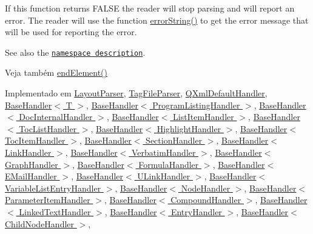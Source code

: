 If this function returns F\-A\-L\-S\-E the reader will stop parsing and will report an error. The reader will use the function \hyperlink{class_q_xml_content_handler_ac86bbbabef3a52aec7615cbbc0adb3f4}{error\-String()} to get the error message that will be used for reporting the error.

See also the \href{xml-sax.html#namespaces}{\tt namespace description}.

\begin{DoxySeeAlso}{Veja também}
\hyperlink{class_q_xml_content_handler_ac85feb837d3634e775cc7c76df84cce0}{end\-Element()} 
\end{DoxySeeAlso}


Implementado em \hyperlink{class_layout_parser_a3ebad496b56e71d502ae20cafd62d524}{Layout\-Parser}, \hyperlink{class_tag_file_parser_a3ebad496b56e71d502ae20cafd62d524}{Tag\-File\-Parser}, \hyperlink{class_q_xml_default_handler_a0712995308713e9df1c0d389568a344b}{Q\-Xml\-Default\-Handler}, \hyperlink{class_base_handler_af861c355ac62b4b24365ddfd226eccd7}{Base\-Handler$<$ T $>$}, \hyperlink{class_base_handler_af861c355ac62b4b24365ddfd226eccd7}{Base\-Handler$<$ Program\-Listing\-Handler $>$}, \hyperlink{class_base_handler_af861c355ac62b4b24365ddfd226eccd7}{Base\-Handler$<$ Doc\-Internal\-Handler $>$}, \hyperlink{class_base_handler_af861c355ac62b4b24365ddfd226eccd7}{Base\-Handler$<$ List\-Item\-Handler $>$}, \hyperlink{class_base_handler_af861c355ac62b4b24365ddfd226eccd7}{Base\-Handler$<$ Toc\-List\-Handler $>$}, \hyperlink{class_base_handler_af861c355ac62b4b24365ddfd226eccd7}{Base\-Handler$<$ Highlight\-Handler $>$}, \hyperlink{class_base_handler_af861c355ac62b4b24365ddfd226eccd7}{Base\-Handler$<$ Toc\-Item\-Handler $>$}, \hyperlink{class_base_handler_af861c355ac62b4b24365ddfd226eccd7}{Base\-Handler$<$ Section\-Handler $>$}, \hyperlink{class_base_handler_af861c355ac62b4b24365ddfd226eccd7}{Base\-Handler$<$ Link\-Handler $>$}, \hyperlink{class_base_handler_af861c355ac62b4b24365ddfd226eccd7}{Base\-Handler$<$ Verbatim\-Handler $>$}, \hyperlink{class_base_handler_af861c355ac62b4b24365ddfd226eccd7}{Base\-Handler$<$ Graph\-Handler $>$}, \hyperlink{class_base_handler_af861c355ac62b4b24365ddfd226eccd7}{Base\-Handler$<$ Formula\-Handler $>$}, \hyperlink{class_base_handler_af861c355ac62b4b24365ddfd226eccd7}{Base\-Handler$<$ E\-Mail\-Handler $>$}, \hyperlink{class_base_handler_af861c355ac62b4b24365ddfd226eccd7}{Base\-Handler$<$ U\-Link\-Handler $>$}, \hyperlink{class_base_handler_af861c355ac62b4b24365ddfd226eccd7}{Base\-Handler$<$ Variable\-List\-Entry\-Handler $>$}, \hyperlink{class_base_handler_af861c355ac62b4b24365ddfd226eccd7}{Base\-Handler$<$ Node\-Handler $>$}, \hyperlink{class_base_handler_af861c355ac62b4b24365ddfd226eccd7}{Base\-Handler$<$ Parameter\-Item\-Handler $>$}, \hyperlink{class_base_handler_af861c355ac62b4b24365ddfd226eccd7}{Base\-Handler$<$ Compound\-Handler $>$}, \hyperlink{class_base_handler_af861c355ac62b4b24365ddfd226eccd7}{Base\-Handler$<$ Linked\-Text\-Handler $>$}, \hyperlink{class_base_handler_af861c355ac62b4b24365ddfd226eccd7}{Base\-Handler$<$ Entry\-Handler $>$}, \hyperlink{class_base_handler_af861c355ac62b4b24365ddfd226eccd7}{Base\-Handler$<$ Child\-Node\-Handler $>$}, 